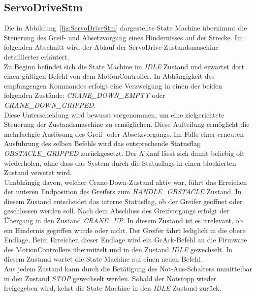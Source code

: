 \documentclass[main.tex]{subfiles} %
\begin{document}
\subsection{ServoDriveStm}
Die in Abbildung~\ref{fig:ServoDriveStm} dargestellte State Machine übernimmt die Steuerung des Greif- und Absetzvorgang eines Hindernisses auf der Strecke.
Im folgenden Abschnitt wird der Ablauf der ServoDrive-Zustandsmaschine detaillierter erläutert.\\
Zu Beginn befindet sich die State Machine im \textit{IDLE} Zustand und erwartet dort einen gültigen Befehl von dem MotionController.
In Abhängigkeit des empfangengen Kommandos erfolgt eine Verzweigung in einen der beiden folgenden Zustände:
\textit{CRANE\_DOWN\_EMPTY} oder \textit{CRANE\_DOWN\_GRIPPED}.\\
Diese Unterscheidung wird bewusst vorgenommen, um eine zielgerichtete Steuerung der Zustandsmaschine zu ermöglichen.
Diese Aufteilung ermöglicht die mehrfachgie Auslösung des Greif- oder Absetzvorgangs. Im Falle einer erneuten Ausführung des selben
Befehls wird das entsprechende Statusflag \textit{OBSTACLE\_GRIPPED} zurückgesetzt. Der Ablauf lässt sich damit beliebig oft wiederholen,
ohne dass das System durch die Statusflags in einen blockierten Zustand versetzt wird.\\
Unabhängig davon, welcher Crane-Down-Zustand aktiv war, führt das Erreichen der unteren Endposition des Greifers
zum \textit{HANDLE\_OBSTACLE} Zustand. In diesem Zustand entscheidet das interne Statusflag, ob der Greifer geöffnet
oder geschlossen werden soll. Nach dem Abschluss des Greifvorgangs erfolgt der Übergang in den Zustand \textit{CRANE\_UP}.
In diesem Zustand ist es irrelevant, ob ein Hindernis gegriffen wurde oder nicht. Der Greifer fährt lediglich in die obere Endlage.
Beim Erreichen dieser Endlage wird ein GcAck-Befehl an die Firmware des MotionControllers übermittelt und in
den Zustand \textit{IDLE} gewechselt. In diesem Zustand wartet die State Machine auf einen neuen Befehl.\\
Aus jedem Zustand kann durch die Betätigung des Not-Aus-Schalters unmittelbar in den Zustand \textit{STOP} gewechselt
werden. Sobald der Notstopp wieder freigegeben wird, kehrt die State Machine in den \textit{IDLE} Zustand zurück.
\end{document}
